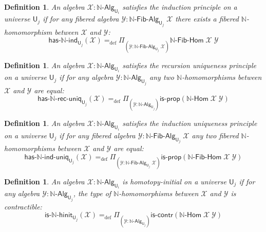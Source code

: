 \documentclass[reqno,10pt,a4paper,oneside]{amsart}
\newcommand{\X}{\mathcal{X}}
\newcommand{\Y}{\mathcal{Y}}
\newcommand{\prd}[1]{\Pi_{#1}}
\newcommand{\defeq}{=_{\mathrm{def}}}
\newcommand{\nat}{\ensuremath{\mathbb{N}}}
\newcommand{\UU}{\mathsf{U}}
\newcommand{\NatAlg}{\nat\text{-}\mathsf{Alg}}
\newcommand{\NatHom}{\nat\text{-}\mathsf{Hom}}
\newcommand{\HasNatInd}{\mathsf{has}\text{-}\nat\text{-}\mathsf{ind}}
\newcommand{\HasNatRecUniq}{\mathsf{has}\text{-}\nat\text{-}\mathsf{rec}\text{-}\mathsf{uniq}}
\newcommand{\HasNatIndUniq}{\mathsf{has}\text{-}\nat\text{-}\mathsf{ind}\text{-}\mathsf{uniq}}
\newcommand{\NatFibAlg}{\nat\text{-}\mathsf{Fib}\text{-}\mathsf{Alg}}
\newcommand{\NatFibHom}{\nat\text{-}\mathsf{Fib}\text{-}\mathsf{Hom}}
\newcommand{\IsNatHInit}{\mathsf{is}\text{-}\nat\text{-}\mathsf{hinit}}
\newcommand{\iscontr}{\mathsf{is}\text{-}\mathsf{contr}}
\newcommand{\isprop}{\mathsf{is}\text{-}\mathsf{prop}}
\numberwithin{equation}{section}
\theoremstyle{mythm}
\theoremstyle{mydef}
\newtheorem{definition}[theorem]{Definition}
\theoremstyle{myrmk}
\begin{document}
\begin{definition}\label{def:NatInd}
An algebra $\mathcal{X} : \NatAlg_{\UU_i}$ \emph{satisfies the induction principle} on a universe $\UU_j$ if for any 
fibered algebra $\Y : \NatFibAlg_{\UU_j} \; \X$ there exists a fibered $\nat$-homomorphism between $\X$ and $\Y$:
\[\HasNatInd_{\UU_j}(\X) \defeq \prd{(\Y:\NatFibAlg_{\UU_j} \; \X)} \NatFibHom \; \X \; \Y\] 
\end{definition}

\begin{definition}\label{def:NatRecUniq}
An algebra $\X : \NatAlg_{\UU_i}$ satisfies the \emph{recursion uniqueness principle} on a universe $\UU_j$ if for any algebra $\Y : \NatAlg_{\UU_j}$ any two $\nat$-homomorphisms between $\X$ and $\Y$ are equal:
\[ \HasNatRecUniq_{\UU_j}(\X) \defeq \prd{(\Y:\NatAlg_{\UU_j})} \isprop(\NatHom \; \X \; \Y)\]
\end{definition}

\begin{definition}\label{def:NatIndUniq}
An algebra $\X : \NatAlg_{\UU_i}$ satisfies the \emph{induction uniqueness principle} on a universe $\UU_j$ if for any fibered algebra $\Y : \NatFibAlg_{\UU_j}\;\X$ any two fibered $\nat$-homomorphisms between $\X$ and $\Y$ are equal:
\[ \HasNatIndUniq_{\UU_j}(\X) \defeq \prd{(\Y:\NatFibAlg_{\UU_j} \; \X)} \isprop(\NatFibHom \; \X \; \Y)\]
\end{definition}

\begin{definition}\label{def:NatInit}
An algebra $\X : \NatAlg_{\UU_i}$ is \emph{homotopy-initial} on a universe $\UU_j$ if for any algebra $\Y : \NatAlg_{\UU_j}$, the type of $\nat$-homomorphisms between $\X$ and $\Y$ is contractible:
\[ \IsNatHInit_{\UU_j}(\X) \defeq \prd{(\Y:\NatAlg_{\UU_j})} \iscontr(\NatHom \; \X \; \Y) \]  
\end{definition}
\end{document}
